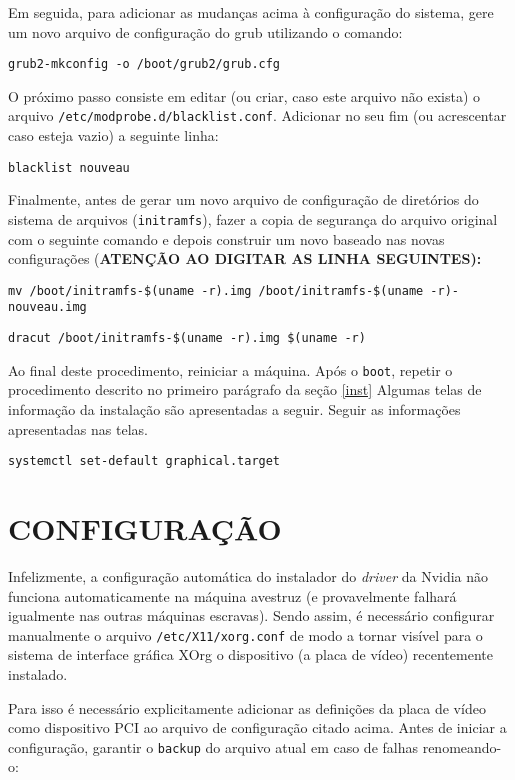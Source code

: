\documentclass[twoside,a4paper,12pt,english]{inac17}
\begin{document}
Em seguida, para adicionar as mudanças acima à configuração do sistema, gere um novo arquivo de configuração do grub utilizando o comando:

\texttt{grub2-mkconfig -o /boot/grub2/grub.cfg}

O próximo passo consiste em editar (ou criar, caso este arquivo não exista) 
o arquivo \texttt{/etc/modprobe.d/blacklist.conf}. Adicionar no seu fim (ou 
acrescentar caso esteja vazio) a seguinte linha:

\texttt{blacklist nouveau}

Finalmente, antes de gerar um novo arquivo de configuração de diretórios 
do sistema de arquivos (\texttt{initramfs}), fazer a copia de segurança 
do arquivo original com o seguinte comando e depois construir um novo baseado nas novas configurações (\textbf{ATENÇÃO AO DIGITAR AS LINHA SEGUINTES):}

\texttt{mv /boot/initramfs-\$(uname -r).img /boot/initramfs-\$(uname -r)-nouveau.img}

\texttt{dracut /boot/initramfs-\$(uname -r).img \$(uname -r)}

Ao final deste procedimento, reiniciar a máquina. Após o \texttt{boot}, 
repetir o procedimento descrito no primeiro parágrafo da seção \ref{inst} 
Algumas telas de informação da instalação são apresentadas a seguir. Seguir 
as informações apresentadas nas telas.


\texttt{systemctl set-default graphical.target}




\section{CONFIGURAÇÃO}

Infelizmente, a configuração automática do instalador do \textit{driver} da Nvidia 
não funciona automaticamente na máquina avestruz (e provavelmente falhará igualmente 
nas outras máquinas escravas). Sendo assim, é necessário configurar manualmente 
o arquivo \texttt{/etc/X11/xorg.conf} de modo a tornar visível para o sistema 
de interface gráfica XOrg o dispositivo (a placa de vídeo) recentemente instalado.

Para isso é necessário explicitamente adicionar as definições da placa de vídeo 
como dispositivo PCI ao arquivo de configuração citado acima. Antes de iniciar a 
configuração, garantir o \texttt{backup} do arquivo atual em caso de falhas renomeando-o:
\end{document}
